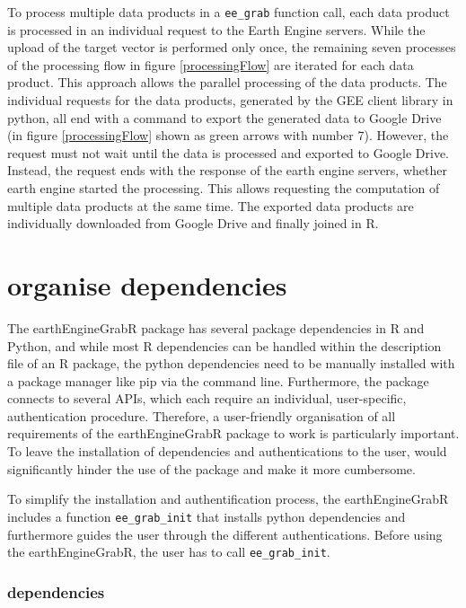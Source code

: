 To process multiple data products in a \texttt{ee\_grab} function call, each data product is processed in an individual request to the Earth Engine servers. While the upload of the target vector is performed only once, the remaining seven processes of the processing flow in figure \ref{processingFlow} are iterated for each data product. This approach allows the parallel processing of the data products. The individual requests for the data products, generated by the GEE client library in python, all end with a command to export the generated data to Google Drive (in figure \ref{processingFlow} shown as green arrows with number 7). However, the request must not wait until the data is processed and exported to Google Drive. Instead, the request ends with the response of the earth engine servers, whether earth engine started the processing. 
This allows requesting the computation of multiple data products at the same time. The exported data products are individually downloaded from Google Drive and finally joined in R.


\section{organise dependencies}


The earthEngineGrabR package has several package dependencies in R and Python, and while most R dependencies can be handled within the description file of an R package, the python dependencies need to be manually installed with a package manager like pip via the command line. Furthermore, the package connects to several APIs, which each require an individual, user-specific, authentication procedure. Therefore, a user-friendly organisation of all requirements of the earthEngineGrabR package to work is particularly important. To leave the installation of dependencies and authentications to the user, would significantly hinder the use of the package and make it more cumbersome. 


To simplify the installation and authentification process, the earthEngineGrabR includes a function \texttt{ee\_grab\_init} that installs python dependencies and furthermore guides the user through the different authentications. Before using the earthEngineGrabR, the user has to call \texttt{ee\_grab\_init}. 

\subsubsection{dependencies}

